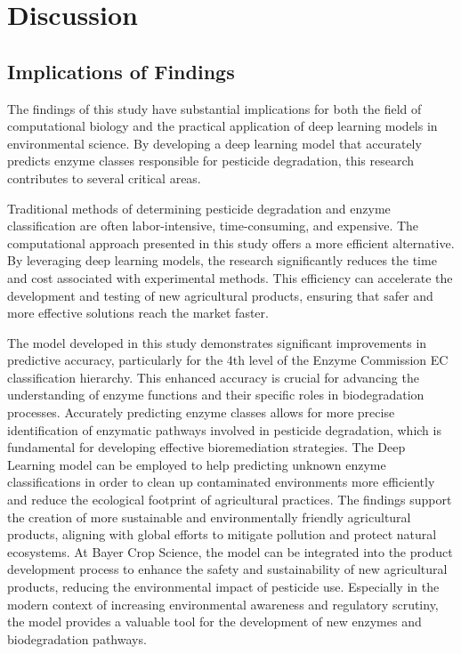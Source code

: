 \section{Discussion}

\subsection{Implications of Findings}
\label{sec:Implications of Findings}

The findings of this study have substantial implications for both the field of computational biology and the practical application of deep learning models in environmental science. By developing a deep learning model that accurately predicts enzyme classes responsible for pesticide degradation, this research contributes to several critical areas.

Traditional methods of determining pesticide degradation and enzyme classification are often labor-intensive, time-consuming, and expensive. The computational approach presented in this study offers a more efficient alternative. By leveraging deep learning models, the research significantly reduces the time and cost associated with experimental methods. This efficiency can accelerate the development and testing of new agricultural products, ensuring that safer and more effective solutions reach the market faster.

The model developed in this study demonstrates significant improvements in predictive accuracy, particularly for the 4th level of the Enzyme Commission EC classification hierarchy. This enhanced accuracy is crucial for advancing the understanding of enzyme functions and their specific roles in biodegradation processes. Accurately predicting enzyme classes allows for more precise identification of enzymatic pathways involved in pesticide degradation, which is fundamental for developing effective bioremediation strategies. The Deep Learning model can be employed to help predicting unknown enzyme classifications in order to clean up contaminated environments more efficiently and reduce the ecological footprint of agricultural practices. The findings support the creation of more sustainable and environmentally friendly agricultural products, aligning with global efforts to mitigate pollution and protect natural ecosystems. At Bayer Crop Science, the model can be integrated into the product development process to enhance the safety and sustainability of new agricultural products, reducing the environmental impact of pesticide use. Especially in the modern context of increasing environmental awareness and regulatory scrutiny, the model provides a valuable tool for the development of new enzymes and biodegradation pathways.


